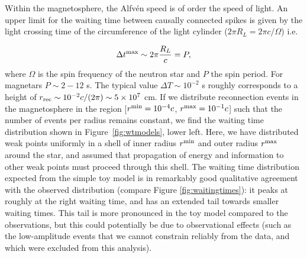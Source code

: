 \documentclass[12pt]{emulateapj}
\begin{document}
Within the magnetosphere, the Alfv\'en speed is of order the speed of light. An upper limit for the waiting time between causally connected spikes is given by the light crossing time of the circumference of the light cylinder ($2\pi R_L=2 \pi c/\Omega$) i.e.

\begin{equation}\label{eq}
\Delta t^{\rm max}\sim2\pi \frac{R_L}{c}=P,
\end{equation}
where $\Omega$ is the spin frequency of the neutron star and $P$ the spin period. For magnetars $P\sim2-12$ s. The typical value $\Delta T\sim10^{-2}$ s roughly corresponds to a height of $r_{\rm rec}\sim10^{-2} c/(2\pi)\sim5\times10^7$ cm. If we distribute reconnection events in the magnetosphere in the region [$r^{\rm min}=10^{-4}c$, $r^{\rm max}=10^{-1}c$] such that the number of events per radius remains constant, we find the waiting time distribution shown in Figure~\ref{fig:wtmodels}, lower left. Here, we have distributed weak points uniformly in a shell of inner radius $r^{\rm min}$ and outer radius $r^{\rm max}$ around the star, and assumed that propagation of energy and information to other weak points must proceed through this shell. The waiting time distribution expected from the simple toy model is in remarkably good qualitative agreement with the observed distribution (compare Figure \ref{fig:waitingtimes}): it peaks at roughly at the right waiting time, and has an extended tail towards smaller waiting times. This tail is more pronounced in the toy model compared to the observations, but this could potentially be due to observational effects (such as the low-amplitude events that we cannot constrain reliably from the data, and which were excluded from this analysis). 
\end{document}
